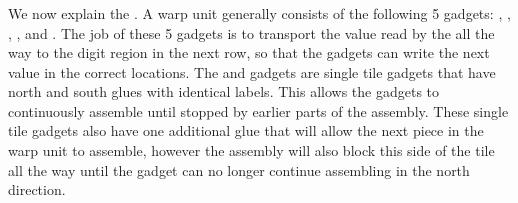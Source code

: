\subsubsection{\warpunit}

%
We now explain the {\warpunit}.
%
A warp unit generally consists of the following 5 gadgets: \prewarp, \firstwarp, \warpbridge, \secondwarp, and \postwarp.
%
The job of these 5 gadgets is to transport the value read by the {\cread} all the way to the digit region in the next row, so that the {\cwrite} gadgets can write the next value in the correct locations.
%
The {\firstwarp} and {\secondwarp} gadgets are single tile gadgets that have north and south glues with identical labels.
%
This allows the gadgets to continuously assemble until stopped by earlier parts of the assembly.
%
These single tile gadgets also have one additional glue that will allow the next piece in the warp unit to assemble, however the assembly will also block this side of the tile all the way until the gadget can no longer continue assembling in the north direction.
%


